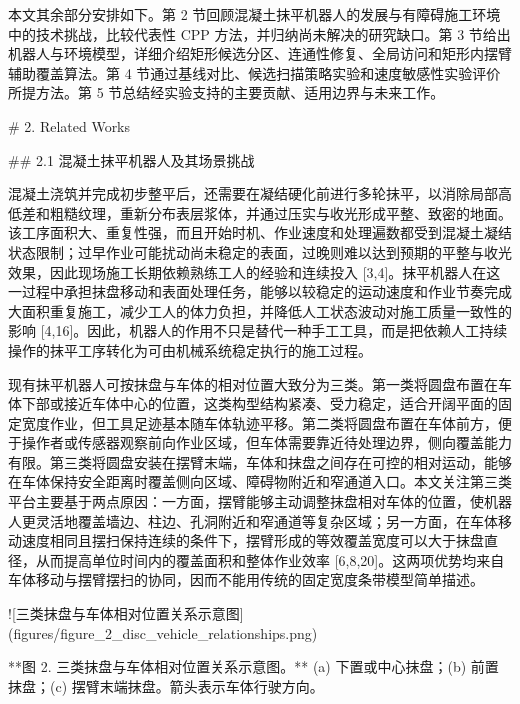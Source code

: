   

本文其余部分安排如下。第 2 节回顾混凝土抹平机器人的发展与有障碍施工环境中的技术挑战，比较代表性 CPP 方法，并归纳尚未解决的研究缺口。第 3 节给出机器人与环境模型，详细介绍矩形候选分区、连通性修复、全局访问和矩形内摆臂辅助覆盖算法。第 4 节通过基线对比、候选扫描策略实验和速度敏感性实验评价所提方法。第 5 节总结经实验支持的主要贡献、适用边界与未来工作。

  

# 2. Related Works

  

## 2.1 混凝土抹平机器人及其场景挑战

  

混凝土浇筑并完成初步整平后，还需要在凝结硬化前进行多轮抹平，以消除局部高低差和粗糙纹理，重新分布表层浆体，并通过压实与收光形成平整、致密的地面。该工序面积大、重复性强，而且开始时机、作业速度和处理遍数都受到混凝土凝结状态限制；过早作业可能扰动尚未稳定的表面，过晚则难以达到预期的平整与收光效果，因此现场施工长期依赖熟练工人的经验和连续投入 [3,4]。抹平机器人在这一过程中承担抹盘移动和表面处理任务，能够以较稳定的运动速度和作业节奏完成大面积重复施工，减少工人的体力负担，并降低人工状态波动对施工质量一致性的影响 [4,16]。因此，机器人的作用不只是替代一种手工工具，而是把依赖人工持续操作的抹平工序转化为可由机械系统稳定执行的施工过程。

  

现有抹平机器人可按抹盘与车体的相对位置大致分为三类。第一类将圆盘布置在车体下部或接近车体中心的位置，这类构型结构紧凑、受力稳定，适合开阔平面的固定宽度作业，但工具足迹基本随车体轨迹平移。第二类将圆盘布置在车体前方，便于操作者或传感器观察前向作业区域，但车体需要靠近待处理边界，侧向覆盖能力有限。第三类将圆盘安装在摆臂末端，车体和抹盘之间存在可控的相对运动，能够在车体保持安全距离时覆盖侧向区域、障碍物附近和窄通道入口。本文关注第三类平台主要基于两点原因：一方面，摆臂能够主动调整抹盘相对车体的位置，使机器人更灵活地覆盖墙边、柱边、孔洞附近和窄通道等复杂区域；另一方面，在车体移动速度相同且摆扫保持连续的条件下，摆臂形成的等效覆盖宽度可以大于抹盘直径，从而提高单位时间内的覆盖面积和整体作业效率 [6,8,20]。这两项优势均来自车体移动与摆臂摆扫的协同，因而不能用传统的固定宽度条带模型简单描述。

  

![三类抹盘与车体相对位置关系示意图](figures/figure_2_disc_vehicle_relationships.png)

**图 2. 三类抹盘与车体相对位置关系示意图。** (a) 下置或中心抹盘；(b) 前置抹盘；(c) 摆臂末端抹盘。箭头表示车体行驶方向。

  

